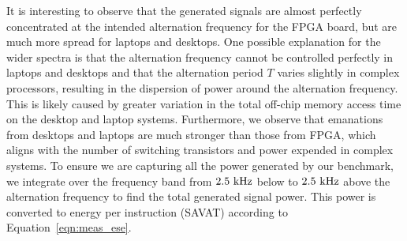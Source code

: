 It is interesting to observe that the generated signals are almost perfectly concentrated at the intended alternation frequency for the FPGA board, but are much more spread for laptops and desktops. One possible explanation for the wider spectra is that the alternation frequency cannot be controlled perfectly in laptops and desktops and that the alternation period $T$ varies slightly in complex processors, resulting in the dispersion of power around the alternation frequency. This is likely caused by greater variation in the total off-chip memory access time on the desktop and laptop systems. Furthermore, we observe that emanations from desktops and laptops are much stronger than those from FPGA, which aligns with the number of switching transistors and power expended in complex systems. To ensure we are capturing all the power generated by our benchmark, we integrate over the frequency band from $2.5~{\rm kHz}$ below to $2.5~{\rm kHz}$ above the alternation frequency to find the total generated signal power. This power is converted to energy per instruction (SAVAT) according to Equation~\ref{eqn:meas_ese}. 

